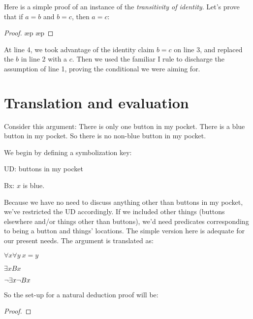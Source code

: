 Here is a simple proof of an instance of the \emph{transitivity of identity}. Let's prove that if $a{=}b$ and $b{=}c$, then $a{=}c$:

\begin{proof}
	\open
		\ae{p}
		\ae{p}
	\close
	 
\end{proof}

At line 4, we took advantage of the identity claim $b{=}c$ on line 3, and replaced the $b$ in line 2 with a $c$. Then we used the familiar \eif{}I rule to discharge the assumption of line 1, proving the conditional we were aiming for.


\section{Translation and evaluation}

Consider this argument: There is only one button in my pocket. There is a blue button in my pocket. So there is no non-blue button in my pocket.

We begin by defining a symbolization key:
\begin{ekey}
\item{UD:} buttons in my pocket
\item{Bx:} $x$ is blue.
\end{ekey}
Because we have no need to discuss anything other than buttons in my pocket, we've restricted the UD accordingly. If we included other things (buttons elsewhere and/or things other than buttons), we'd need predicates corresponding to being a button and things' locations. The simple version here is adequate for our present needs. The argument is translated as:
\begin{earg}
\item{} $\forall x \forall y\ x{=}y$
\item{} $\exists x Bx$
\item{\therefore} $\neg \exists x \neg Bx$
\end{earg}

So the set-up for a natural deduction proof will be:

\begin{proof}
	 
	\have{}{}{}
\end{proof}

